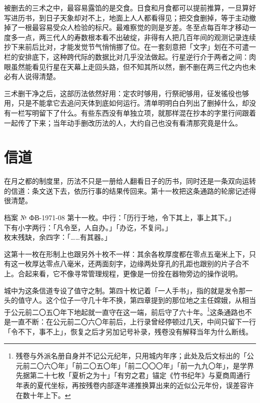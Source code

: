被删去的三术之中，最容易露馅的是交食。日食和月食都可以提前推算，一旦算好写进历书，到日子天象却对不上，地面上人人都看得见；把交食删掉，等于主动撤掉了一根最容易受众人检验的标尺。最难察觉的则是岁差。冬至点每百年才移动一度多一点，两三代人的寿数根本看不出破绽，非得有人把几百年间的观测记录连续抄下来前后比对，才能发觉节气悄悄挪了位。在一套刻意把「文字」划在不可遣一栏的安排底下，这种跨代际的数据比对几乎没法做起。行星逆行介于两者之间：肉眼虽然能看见行星在天幕上走回头路，但不知其所以然，删不删在两三代之内也未必有人说得清楚。

三术删干净之后，这部历法依然好用：定农时够用，行祭祀够用，征发徭役也够用，只是不能拿它去追问天体到底如何运行。清单明明白白列出了删掉什么，却没有一栏写明留下了什么。有些东西没有单独立项，就那样混在抄本的字里行间跟着一起传了下来；当年动手删改历法的人，大约自己也没有看清那究竟是什么。

\section{信道}

在月之都的制度里，历法不只是一册给人翻看日子的历书，同时还是一条双向运转的信道：条文送下去，依历行事的结果传回来。第十一枚把这条通路的轮廓记述得很清楚。

\begin{archive}[内部参考]{档案 № ФВ-1971-08}
第十一枚。中行：「历行于地，令下其上，事上其下。」\\
下有小字两行：「凡令至，人自办。」「办讫，不复问。」\\
枚末残缺，余四字：「……有其器。」
\end{archive}

这第十一枚在形制上也跟另外十枚不一样：其余各枚厚度都在零点五毫米上下，只有这一枚厚达零点八毫米，还两面刻字，边缘两处穿孔的孔距也跟别的片子合不上。合起来看，它不像寻常管理规程，更像是一份拴在器物旁边的操作说明。

城中为这条信道专设了值守之制。第四十枚记着「一人手书」，指的就是发令那一头的值守人。这个位子一守几十年不换，第四章提到的那位地之主任嫦娥，从相当于公元前二〇五〇年下地起就一直守在这一端，前后守了六十年。\footnote{残卷与外派名册自身并不记公元纪年，只用城内年序；此处及后文标出的「公元前二〇六〇年」「前二〇五〇年」「前二〇〇〇年」「前一九九〇年」，是学界先据第二十七枚「夏析之为十」「有穷之君」锚定《竹书纪年》与夏商周通行年表的夏代坐标，再按残卷内部逐年递推换算出来的近似公元年份，误差容许在数十年上下。}这条通路也不是一直不断：在公元前二〇六〇年前后，上行录曾经停顿过几天，中间只留下一行「令不下，事不上」，恢复之后才另加记号补录，残卷没有解释当年为什么断线。

